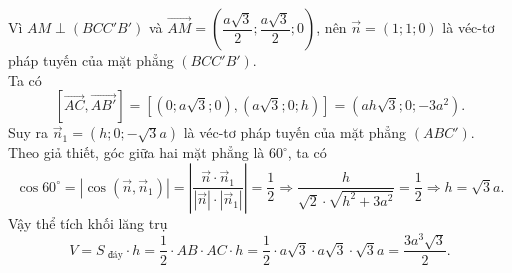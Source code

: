 \begin{bt}
{\begin{center}
		\end{center}
		Vì $AM \perp (BCC'B')$ và $\overrightarrow{AM} = \left(\dfrac{a\sqrt{3}}{2}; \dfrac{a\sqrt{3}}{2}; 0\right)$, nên $\overrightarrow{n}  = (1;1;0)$ là véc-tơ pháp tuyến của mặt phẳng $(BCC'B')$.\\
		Ta  có
		$$ 
		\left[\overrightarrow{AC}, \overrightarrow{AB'}\right] = \left[(0;a\sqrt{3};0), \left(a\sqrt{3};0;h\right)\right]  = \left(ah\sqrt{3};0; -3a^2\right).
		$$ 
		Suy ra $\overrightarrow{n}_1 = \left(h; 0; -\sqrt{3}a\right)$ là véc-tơ pháp tuyến của mặt phẳng  $(ABC')$.\\
		Theo giả thiết, góc giữa  hai mặt phẳng là $60^\circ$, ta có
		$$ 
		\cos 60^\circ = \left|\cos(\overrightarrow{n}, \overrightarrow{n}_1)\right| = \left|\dfrac{\overrightarrow{n}  \cdot \overrightarrow{n}_1}{\left|\overrightarrow{n}\right|\cdot \left|\overrightarrow{n}_1\right|}\right| = \dfrac{1}{2}
		\Rightarrow \dfrac{h}{\sqrt{2} \cdot \sqrt{h^2 + 3a^2}} = \dfrac{1}{2}  \Rightarrow h = \sqrt{3}a.
		 $$
		Vậy thể tích khối lăng  trụ
		 $$
		V = S_{\text{ đáy}} \cdot h = \dfrac{1}{2} \cdot AB \cdot AC \cdot h = \dfrac{1}{2} \cdot a\sqrt{3} \cdot a\sqrt{3} \cdot \sqrt{3}a = \dfrac{3a^3\sqrt{3}}{2}. 
		 $$
	 }
\end{bt}

